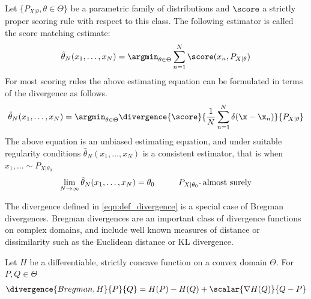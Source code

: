 \begin{definition}\label{def:score_matching}
Let $\{P_{X\vert\theta}, \theta\in\Theta\}$ be a parametric family of distributions and $\score$ a strictly proper scoring rule with respect to this class. The following estimator is called the score matching estimate:
\begin{equation}
	\hat{\theta}_N(x_1,\ldots,x_N) = \argmin_{\theta\in\Theta} \sum_{n=1}^{N}\score(x_n,P_{X\vert\theta}) \label{eqn:score_matching}
\end{equation}
For most scoring rules the above estimating equation can be formulated in terms of the divergence as follows.
\begin{equation}
	\hat{\theta}_N(x_1,\ldots,x_N) = \argmin_{\theta\in\Theta} \divergence{\score}{\frac{1}{N}\sum_{n=1}^{N}\delta(\x-\x_n)}{P_{X\vert\theta}}
\end{equation}
The above equation is an unbiased estimating equation, and under suitable regularity conditions $\hat{\theta}_N(x_1,\ldots,x_N)$ is a consistent estimator, that is when $x_1,\ldots\sim P_{X\vert\theta_0}$ \iid
\begin{equation}
	\lim_{N \rightarrow \infty} \hat{\theta}_N(x_1,\ldots,x_N) = \theta_0\hspace{1cm} P_{X\vert\theta_0}\mbox{-\,almost surely}
\end{equation}
\end{definition}

The divergence defined in \eqref{eqn:def_divergence} is a special case of Bregman divergences. Bregman divergences are an important class of divergence functions on complex domains, and include well known measures of distance or dissimilarity such as the Euclidean distance or KL divergence.

\begin{definition}
	Let $H$ be a differentiable, strictly concave function on a convex domain $\Theta$. For $P,Q\in\Theta$ 
	\begin{align}
		\divergence{Bregman,H}{P}{Q} = H(P) - H(Q) + \scalar{\nabla H(Q)}{Q-P}
	\end{align}
\end{definition}

